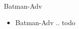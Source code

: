 
\begin{frame}{Batman-Adv}
    \begin{itemize}
        \item Batman-Adv .. todo
    \end{itemize}
\end{frame}
